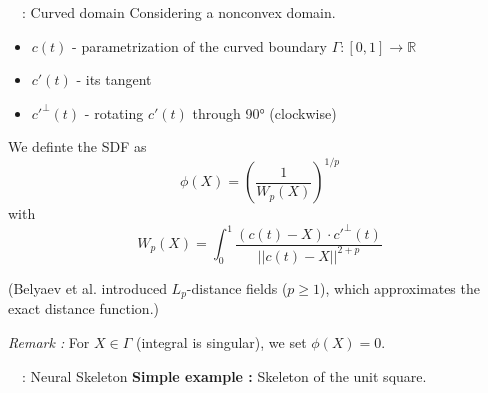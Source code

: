 \begin{frame}{\appendixname~\theappendixframenumber~: Curved domain \cite{sukumar_exact_2022}}
	Considering a nonconvex domain.
	\begin{itemize}[]
		\item $c(t)$ - parametrization of the curved boundary $\Gamma:[0,1]\rightarrow\mathbb{R}$
		\item $c'(t)$ - its tangent
		\item $c'^\perp(t)$ - rotating $c'(t)$ through 90° (clockwise)
	\end{itemize}
	\vspace{10pt}
	\begin{minipage}{0.68\linewidth}
		We definte the SDF as 
		\begin{equation*}
			\phi(X)=\left(\frac{1}{W_p(X)}\right)^{1/p}
		\end{equation*}
		with
		\begin{equation*}
			W_p(X)=\int_0^1\frac{(c(t)-X)\cdot c'^\perp(t)}{||c(t)-X||^{2+p}}
		\end{equation*}
	\end{minipage}
	\begin{minipage}{0.28\linewidth}
		\centering
	\end{minipage}
	\footnotesize
	
	\vspace{5pt}
	(Belyaev et al. \cite{belyaev_signed_2013} introduced $L_p$-distance ﬁelds ($p\ge 1$), which approximates the exact distance function.)
	
	\vspace{15pt}
	\textit{Remark :} For $X\in\Gamma$ (integral is singular), we set $\phi(X)=0$.
\end{frame}
\addtocounter{appendixframenumber}{1}

\begin{frame}{\appendixname~\theappendixframenumber~: Neural Skeleton}
	\textbf{Simple example :} Skeleton of the unit square.
	
	\begin{minipage}{\linewidth}
		\centering
	\end{minipage}
\end{frame}
\addtocounter{appendixframenumber}{1}